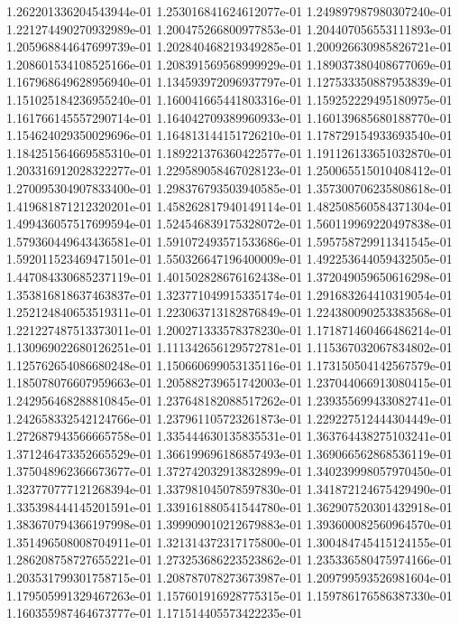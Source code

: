 1.262201336204543944e-01
1.253016841624612077e-01
1.249897987980307240e-01
1.221274490270932989e-01
1.200475266800977853e-01
1.204407056553111893e-01
1.205968844647699739e-01
1.202840468219349285e-01
1.200926630985826721e-01
1.208601534108525166e-01
1.208391569568999929e-01
1.189037380408677069e-01
1.167968649628956940e-01
1.134593972096937797e-01
1.127533350887953839e-01
1.151025184236955240e-01
1.160041665441803316e-01
1.159252229495180975e-01
1.161766145557290714e-01
1.164042709389960933e-01
1.160139685680188770e-01
1.154624029350029696e-01
1.164813144151726210e-01
1.178729154933693540e-01
1.184251564669585310e-01
1.189221376360422577e-01
1.191126133651032870e-01
1.203316912028322277e-01
1.229589058467028123e-01
1.250065515010408412e-01
1.270095304907833400e-01
1.298376793503940585e-01
1.357300706235808618e-01
1.419681871212320201e-01
1.458262817940149114e-01
1.482508560584371304e-01
1.499436057517699594e-01
1.524546839175328072e-01
1.560119969220497838e-01
1.579360449643436581e-01
1.591072493571533686e-01
1.595758729911341545e-01
1.592011523469471501e-01
1.550326647196400009e-01
1.492253644059432505e-01
1.447084330685237119e-01
1.401502828676162438e-01
1.372049059650616298e-01
1.353816818637463837e-01
1.323771049915335174e-01
1.291683264410319054e-01
1.252124840653519311e-01
1.223063713182876849e-01
1.224380090253383568e-01
1.221227487513373011e-01
1.200271333578378230e-01
1.171871460466486214e-01
1.130969022680126251e-01
1.111342656129572781e-01
1.115367032067834802e-01
1.125762654086680248e-01
1.150660699053135116e-01
1.173150504142567579e-01
1.185078076607959663e-01
1.205882739651742003e-01
1.237044066913080415e-01
1.242956468288810845e-01
1.237648182088517262e-01
1.239355699433082741e-01
1.242658332542124766e-01
1.237961105723261873e-01
1.229227512444304449e-01
1.272687943566665758e-01
1.335444630135835531e-01
1.363764438275103241e-01
1.371246473352665529e-01
1.366199696186857493e-01
1.369066562868536119e-01
1.375048962366673677e-01
1.372742032913832899e-01
1.340239998057970450e-01
1.323770777121268394e-01
1.337981045078597830e-01
1.341872124675429490e-01
1.335398444145201591e-01
1.339161880541544780e-01
1.362907520301432918e-01
1.383670794366197998e-01
1.399909010212679883e-01
1.393600082560964570e-01
1.351496508008704911e-01
1.321314372317175800e-01
1.300484745415124155e-01
1.286208758727655221e-01
1.273253686223523862e-01
1.235336580475974166e-01
1.203531799301758715e-01
1.208787078273673987e-01
1.209799593526981604e-01
1.179505991329467263e-01
1.157601916928775315e-01
1.159786176586387330e-01
1.160355987464673777e-01
1.171514405573422235e-01

